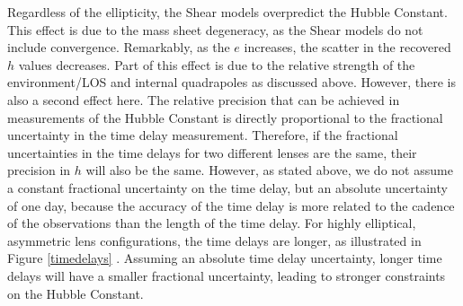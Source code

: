 Regardless of the ellipticity, the Shear models overpredict the Hubble Constant. This effect is due to the mass sheet degeneracy, as the Shear models do not include convergence. Remarkably, as the $e$ increases, the scatter in the recovered $h$ values decreases. Part of this effect is due to the relative strength of the environment/LOS and internal quadrapoles as discussed above. However, there is also a second effect here. The relative precision that can be achieved in measurements of the Hubble Constant is directly proportional to the fractional uncertainty in the time delay measurement. Therefore, if the fractional uncertainties in the time delays for two different lenses are the same, their precision in $h$ will also be the same. However, as stated above, we do not assume a constant fractional uncertainty on the time delay, but an absolute uncertainty of one day, because the accuracy of the time delay is more related to the cadence of the observations than the length of the time delay. For highly elliptical, asymmetric lens configurations, the time delays are longer, as illustrated in Figure \ref{timedelays} \citep[see also][]{Witt00}. Assuming an absolute time delay uncertainty, longer time delays will have a smaller fractional uncertainty, leading to stronger constraints on the Hubble Constant.